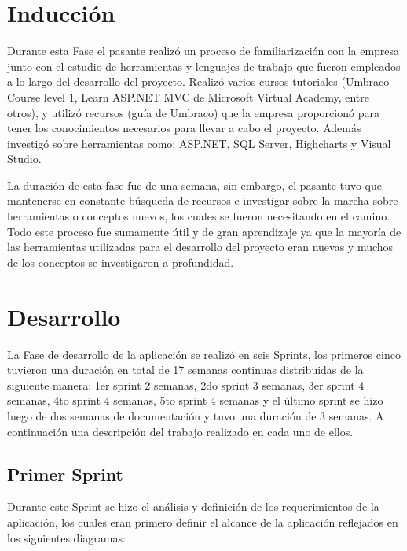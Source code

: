 \section{Inducción}
Durante esta Fase el pasante realizó un proceso de familiarización con la empresa junto con el estudio de herramientas y lenguajes de trabajo que fueron empleados a lo largo del desarrollo del proyecto.
Realizó varios cursos tutoriales (Umbraco Course level 1, Learn ASP.NET MVC de Microsoft Virtual Academy, entre otros),  y utilizó recursos (guía de Umbraco) que la empresa proporcionó para tener los conocimientos necesarios para llevar a cabo el proyecto. Además investigó sobre herramientas como: ASP.NET, SQL Server, Highcharts y Visual Studio.

La duración de esta fase fue de una semana, sin embargo, el pasante tuvo que mantenerse en constante búsqueda de recursos e investigar sobre la marcha sobre herramientas o conceptos nuevos, los cuales se fueron necesitando en el camino. Todo este proceso fue sumamente útil y de gran aprendizaje ya que la mayoría de las herramientas utilizadas para el desarrollo del proyecto eran nuevas y muchos de los conceptos se investigaron a profundidad.

\section{Desarrollo}
La Fase de desarrollo de la aplicación se realizó en seis Sprints, los  primeros cinco tuvieron una duración en total de 17 semanas continuas distribuidas de la siguiente manera: 1er sprint 2 semanas, 2do sprint 3 semanas, 3er sprint 4 semanas, 4to sprint 4 semanas, 5to sprint 4 semanas y el último sprint se hizo luego de dos semanas de documentación y tuvo una duración de 3 semanas. A continuación una descripción del trabajo realizado en cada uno de ellos.
\pagebreak
\subsection{Primer Sprint}
Durante este Sprint se hizo el análisis y definición de los requerimientos de la aplicación, los cuales eran primero definir el alcance de la aplicación reflejados en los siguientes diagramas:


